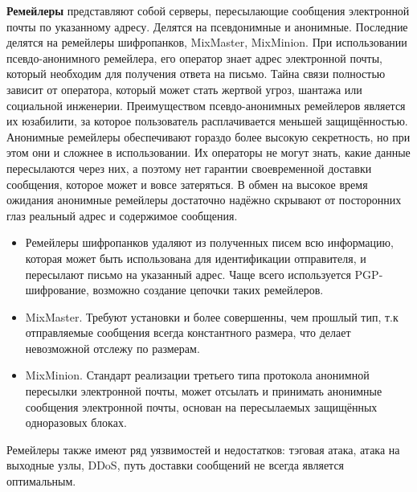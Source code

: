 \textbf{Ремейлеры} представляют собой серверы, пересылающие сообщения электронной почты по указанному адресу. Делятся на псевдонимные и анонимные. Последние делятся на ремейлеры шифропанков, MixMaster, MixMinion. При использовании псевдо-анонимного ремейлера, его оператор знает адрес электронной почты, который необходим для получения ответа на письмо. Тайна связи полностью зависит от оператора, который может стать жертвой угроз, шантажа или социальной инженерии. Преимуществом псевдо-анонимных ремейлеров является их юзабилити, за которое пользователь расплачивается меньшей защищённостью. Анонимные ремейлеры обеспечивают гораздо более высокую секретность, но при этом они и сложнее в использовании. Их операторы не могут знать, какие данные пересылаются через них, а поэтому нет гарантии своевременной доставки сообщения, которое может и вовсе затеряться.%
В обмен на высокое время ожидания анонимные ремейлеры достаточно надёжно скрывают от посторонних глаз реальный адрес и содержимое сообщения. 
\begin{itemize}
	\item Ремейлеры шифропанков удаляют из полученных писем всю информацию, которая может быть использована для идентификации отправителя, и пересылают письмо на указанный адрес. Чаще всего используется PGP-шифрование, возможно создание цепочки таких ремейлеров.
	\item MixMaster. Требуют установки и более совершенны, чем прошлый тип, т.к отправляемые сообщения всегда константного размера, что делает невозможной отслежу по размерам.
	\item MixMinion.  Стандарт реализации третьего типа протокола анонимной пересылки электронной почты, может отсылать и принимать анонимные сообщения электронной почты, основан на пересылаемых защищённых одноразовых блоках. %
\end{itemize}
Ремейлеры также имеют ряд уязвимостей и недостатков: тэговая атака, атака на выходные узлы, DDoS, путь доставки сообщений не всегда является оптимальным.

